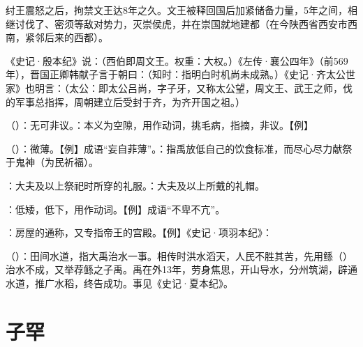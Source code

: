 {\begin{lyenumerate}
\item 纣王震怒之后，拘禁文王达8年之久。文王被释回国后加紧储备力量，5年之间，相继讨伐了、密须等敌对势力，灭崇侯虎，并在崇国就地建都（在今陕西省西安市西南，紧邻后来的西都）。

\item 《史记·殷本纪》说：（西伯即周文王。权重：大权。）《左传·襄公四年》（前569年），晋国正卿韩献子言于朝曰：（知时：指明白时机尚未成熟。）《史记·齐太公世家》也明言：（太公：即太公吕尚，字子牙，又称太公望，周文王、武王之师，伐的军事总指挥，周朝建立后受封于齐，为齐开国之祖。）
\end{lyenumerate}
}
{}


{
\item {}（）：无可非议。：本义为空隙，用作动词，挑毛病，指摘，非议。【例】 
\item {}（）：微薄。【例】成语“妄自菲薄”。：指禹放低自己的饮食标准，而尽心尽力献祭于鬼神（为民祈福）。

\item {}：大夫及以上祭祀时所穿的礼服。：大夫及以上所戴的礼帽。
\item {}：低矮，低下，用作动词。【例】成语“不卑不亢”。
\item {}：房屋的通称，又专指帝王的宫殿。【例】《史记·项羽本纪》：

\item {}（）：田间水道，指大禹治水一事。相传时洪水滔天，人民不胜其苦，先用鲧（）治水不成，又举荐鲧之子禹。禹在外13年，劳身焦思，开山导水，分州筑湖，辟通水道，推广水稻，终告成功。事见《史记·夏本纪》。
}
{}



\chapter{子罕}

